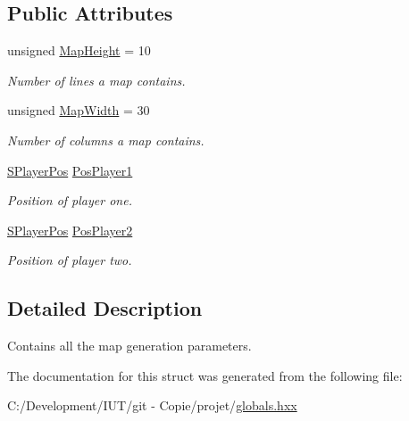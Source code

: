 \subsection*{Public Attributes}
\begin{DoxyCompactItemize}
\item 
\hypertarget{struct_chase_game_1_1_s_map_gen_params_a772c51dab66176dfe733e4e20cbf85d4}{unsigned \hyperlink{struct_chase_game_1_1_s_map_gen_params_a772c51dab66176dfe733e4e20cbf85d4}{Map\-Height} = 10}\label{struct_chase_game_1_1_s_map_gen_params_a772c51dab66176dfe733e4e20cbf85d4}

\begin{DoxyCompactList}\small\item\em Number of lines a map contains. \end{DoxyCompactList}\item 
\hypertarget{struct_chase_game_1_1_s_map_gen_params_a0897aeaa1a1a3a66697a6b441ca8c2de}{unsigned \hyperlink{struct_chase_game_1_1_s_map_gen_params_a0897aeaa1a1a3a66697a6b441ca8c2de}{Map\-Width} = 30}\label{struct_chase_game_1_1_s_map_gen_params_a0897aeaa1a1a3a66697a6b441ca8c2de}

\begin{DoxyCompactList}\small\item\em Number of columns a map contains. \end{DoxyCompactList}\item 
\hypertarget{struct_chase_game_1_1_s_map_gen_params_a8db28a9ee45a200d67b20fc803645501}{\hyperlink{struct_chase_game_1_1_s_player_pos}{S\-Player\-Pos} \hyperlink{struct_chase_game_1_1_s_map_gen_params_a8db28a9ee45a200d67b20fc803645501}{Pos\-Player1}}\label{struct_chase_game_1_1_s_map_gen_params_a8db28a9ee45a200d67b20fc803645501}

\begin{DoxyCompactList}\small\item\em Position of player one. \end{DoxyCompactList}\item 
\hypertarget{struct_chase_game_1_1_s_map_gen_params_afd0a0d4b22e228d547af88d38b6ae963}{\hyperlink{struct_chase_game_1_1_s_player_pos}{S\-Player\-Pos} \hyperlink{struct_chase_game_1_1_s_map_gen_params_afd0a0d4b22e228d547af88d38b6ae963}{Pos\-Player2}}\label{struct_chase_game_1_1_s_map_gen_params_afd0a0d4b22e228d547af88d38b6ae963}

\begin{DoxyCompactList}\small\item\em Position of player two. \end{DoxyCompactList}\end{DoxyCompactItemize}


\subsection{Detailed Description}
Contains all the map generation parameters. 

The documentation for this struct was generated from the following file\-:\begin{DoxyCompactItemize}
\item 
C\-:/\-Development/\-I\-U\-T/git -\/ Copie/projet/\hyperlink{globals_8hxx}{globals.\-hxx}\end{DoxyCompactItemize}
